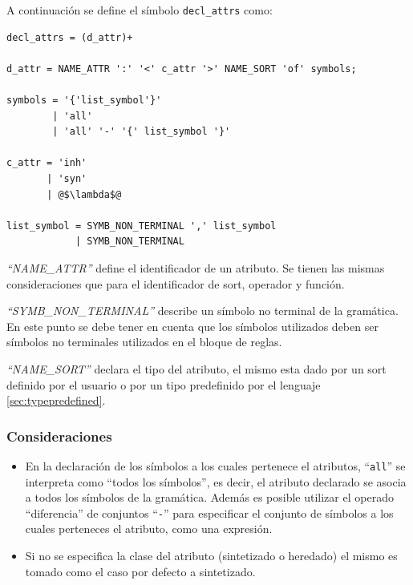A continuación se define el símbolo \texttt{decl\_attrs} como:

\begin{lstlisting}[escapeinside=@@, frame=shadowbox, rulesepcolor=\color{blue}, language=inform]
decl_attrs = (d_attr)+ 

d_attr = NAME_ATTR ':' '<' c_attr '>' NAME_SORT 'of' symbols;

symbols = '{'list_symbol'}' 
        | 'all'
        | 'all' '-' '{' list_symbol '}'

c_attr = 'inh'
       | 'syn'
       | @$\lambda$@

list_symbol = SYMB_NON_TERMINAL ',' list_symbol
            | SYMB_NON_TERMINAL 
\end{lstlisting}

\textit{``NAME\_ATTR''} define el identificador de un atributo. Se tienen las mismas consideraciones que para el identificador de sort, operador y función.

\textit{``SYMB\_NON\_TERMINAL''} describe un símbolo no terminal de la gramática. En este punto se debe tener en cuenta que los símbolos utilizados deben ser símbolos no terminales utilizados en el bloque de reglas.

\textit{``NAME\_SORT''} declara el tipo del atributo, el mismo esta dado por un sort definido por el usuario o por un tipo predefinido por el lenguaje \ref{sec:typepredefined}.

\subsubsection*{Consideraciones}

\begin{itemize}
\item En la declaración de los símbolos a los cuales pertenece el atributos, ``\texttt{all}'' se interpreta como ``todos los símbolos'', es decir, el atributo declarado se asocia a todos los símbolos de la gramática. Además es posible utilizar el operado ``diferencia'' de conjuntos ``\texttt{-}'' para especificar el conjunto de símbolos a los cuales perteneces el atributo, como una expresión.

\item Si no se especifica la clase del atributo (sintetizado o heredado) el mismo es tomado como el caso por defecto a sintetizado.
\end{itemize}


